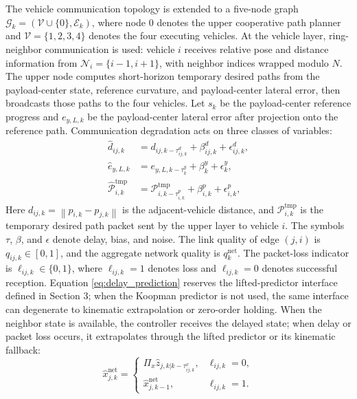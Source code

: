 \documentclass[twocolumn,3p,times,procedia]{elsarticle}
\newcommand{\norm}[1]{\left\lVert #1 \right\rVert}
\begin{document}
The vehicle communication topology is extended to a five-node graph $\mathcal G_k=(\mathcal V\cup\{0\},\mathcal E_k)$, where node $0$ denotes the upper cooperative path planner and $\mathcal V=\{1,2,3,4\}$ denotes the four executing vehicles. At the vehicle layer, ring-neighbor communication is used: vehicle $i$ receives relative pose and distance information from $\mathcal N_i=\{i-1,i+1\}$, with neighbor indices wrapped modulo $N$. The upper node computes short-horizon temporary desired paths from the payload-center state, reference curvature, and payload-center lateral error, then broadcasts those paths to the four vehicles. Let $s_k$ be the payload-center reference progress and $e_{y,L,k}$ be the payload-center lateral error after projection onto the reference path. Communication degradation acts on three classes of variables:
\begin{equation}
\begin{aligned}
\hat d_{ij,k}&=d_{ij,k-\tau^d_{ij,k}}+\beta^d_{ij,k}+\epsilon^d_{ij,k},\\
\hat e_{y,L,k}&=e_{y,L,k-\tau^y_k}+\beta^y_k+\epsilon^y_k,\\
\hat{\mathcal P}_{i,k}^{\mathrm{tmp}}&=\mathcal P_{i,k-\tau^p_{i,k}}^{\mathrm{tmp}}+\beta^p_{i,k}+\epsilon^p_{i,k},
\end{aligned}
\label{eq:comm_corrupted_measurements}
\end{equation}
Here $d_{ij,k}=\norm{p_{i,k}-p_{j,k}}$ is the adjacent-vehicle distance, and $\mathcal P_{i,k}^{\mathrm{tmp}}$ is the temporary desired path packet sent by the upper layer to vehicle $i$. The symbols $\tau$, $\beta$, and $\epsilon$ denote delay, bias, and noise. The link quality of edge $(j,i)$ is $q_{ij,k}\in[0,1]$, and the aggregate network quality is $q_k^{\mathrm{net}}$. The packet-loss indicator is $\ell_{ij,k}\in\{0,1\}$, where $\ell_{ij,k}=1$ denotes loss and $\ell_{ij,k}=0$ denotes successful reception. Equation \eqref{eq:delay_prediction} reserves the lifted-predictor interface defined in Section 3; when the Koopman predictor is not used, the same interface can degenerate to kinematic extrapolation or zero-order holding. When the neighbor state is available, the controller receives the delayed state; when delay or packet loss occurs, it extrapolates through the lifted predictor or its kinematic fallback:
\begin{equation}
\hat x_{j,k}^{\mathrm{net}}=
\begin{cases}
\Pi_x \hat z_{j,k|k-\tau^x_{ij,k}}, & \ell_{ij,k}=0,\\
\hat x_{j,k-1}^{\mathrm{net}}, & \ell_{ij,k}=1 .
\end{cases}
\label{eq:delay_prediction}
\end{equation}
\end{document}
